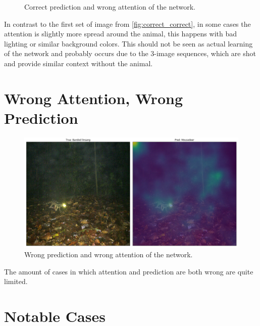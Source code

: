 \documentclass[journal, a4paper]{IEEEtran}
\begin{document}
\begin{figure}[!hbt]
\begin{center}
		\caption{Correct prediction and wrong attention of the network.}
		\label{fig:correct_wrong}
		\end{center}
	\end{figure}
	
In contrast to the first set of image from \ref{fig:correct_correct}, in some cases the attention is slightly more spread around the animal, this happens with bad lighting or similar background colors. 
This should not be seen as actual learning of the network and probably occurs due to the 3-image sequences, which are shot and provide similar context without the animal. 

\section{Wrong Attention, Wrong Prediction}
	\begin{figure}[!hbt]
		\begin{center}
		\includegraphics[width=\columnwidth]{images/No_Attention_wrong.png}
		\caption{Wrong prediction and wrong attention of the network.}
		\label{fig:wrong_wrong}
		\end{center}
	\end{figure}
	
The amount of cases in which attention and prediction are both wrong are quite limited.

\section{Notable Cases}
\end{document}
